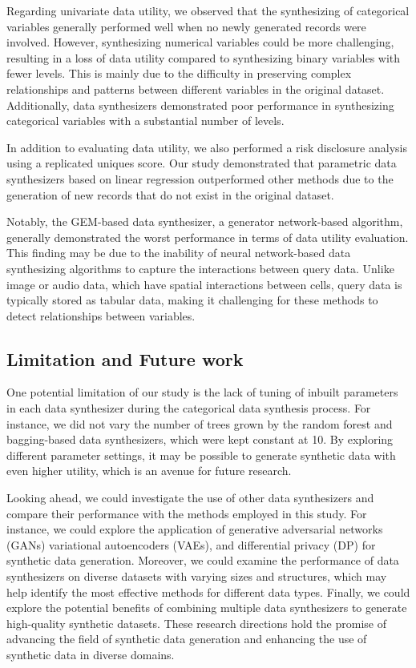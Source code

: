 Regarding univariate data utility, we observed that the synthesizing of categorical variables generally performed well when no newly generated records were involved. However, synthesizing numerical variables could be more challenging, resulting in a loss of data utility compared to synthesizing binary variables with fewer levels. This is mainly due to the difficulty in preserving complex relationships and patterns between different variables in the original dataset. Additionally, data synthesizers demonstrated poor performance in synthesizing categorical variables with a substantial number of levels.

In addition to evaluating data utility, we also performed a risk disclosure analysis using a replicated uniques score. Our study demonstrated that parametric data synthesizers based on linear regression outperformed other methods due to the generation of new records that do not exist in the original dataset.

Notably, the GEM-based data synthesizer, a generator network-based algorithm, generally demonstrated the worst performance in terms of data utility evaluation. This finding may be due to the inability of neural network-based data synthesizing algorithms to capture the interactions between query data. Unlike image or audio data, which have spatial interactions between cells, query data is typically stored as tabular data, making it challenging for these methods to detect relationships between variables.

\subsection{Limitation and Future work}
\label{subsec:future}
One potential limitation of our study is the lack of tuning of inbuilt parameters in each data synthesizer during the categorical data synthesis process. For instance, we did not vary the number of trees grown by the random forest and bagging-based data synthesizers, which were kept constant at 10. By exploring different parameter settings, it may be possible to generate synthetic data with even higher utility, which is an avenue for future research.

Looking ahead, we could investigate the use of other data synthesizers and compare their performance with the methods employed in this study. For instance, we could explore the application of generative adversarial networks (GANs) variational autoencoders (VAEs), and differential privacy (DP) for synthetic data generation. Moreover, we could examine the performance of data synthesizers on diverse datasets with varying sizes and structures, which may help identify the most effective methods for different data types. Finally, we could explore the potential benefits of combining multiple data synthesizers to generate high-quality synthetic datasets. These research directions hold the promise of advancing the field of synthetic data generation and enhancing the use of synthetic data in diverse domains.